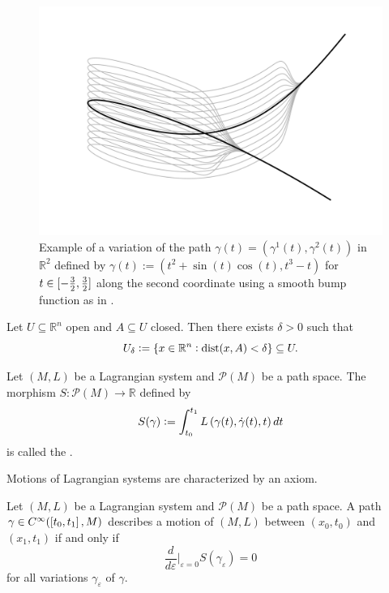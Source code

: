 \begin{example}
	\begin{figure}[h!tb]
		\centering
		\includegraphics[width = .83\textwidth]{variation.pdf}
		\caption{Example of a variation of the path $\gamma(t) = (\gamma^1(t),\gamma^2(t))$ in $\mathbb{R}^2$ defined by $\gamma(t) := (t^2 + \sin(t)\cos(t),t^3 - t)$ for $t \in \intcc[0]{-\frac{3}{2},\frac{3}{2}}$ along the second coordinate using a smooth bump function as in \cite[42]{lee:smooth_manifolds:2013}.}
		\label{fig:variation}
	\end{figure}
\end{example}

\begin{exercise}
	\label{ex:U_delta_neighbourhood}
	Let $U \subseteq \mathbb{R}^n$ open and $A \subseteq U$ closed. Then there exists $\delta > 0$ such that
	\begin{equation*}
		U_\delta := \cbr[0]{x \in \mathbb{R}^n : \dist(x,A) < \delta} \subseteq U.
	\end{equation*}
\end{exercise}

\begin{definition}
	Let $(M,L)$ be a Lagrangian system and $\mathcal{P}(M)$ be a path space. The morphism $S : \mathcal{P}(M) \to \mathbb{R}$ defined by
	\begin{equation*}
		S(\gamma) := \int_{t_0}^{t_1} L\del[0]{\gamma(t),\dot{\gamma}(t),t} dt
	\end{equation*}
	\noindent is called the .
\end{definition}

Motions of Lagrangian systems are characterized by an axiom.

\begin{axiom}
	\label{ax:Hamilton_least_action}
	Let $(M,L)$ be a Lagrangian system and $\mathcal{P}(M)$ be a path space. A path $\gamma \in C^\infty(\intcc[0]{t_0,t_1},M)$ describes a motion of $(M,L)$ between $(x_0,t_0)$ and $(x_1,t_1)$ if and only if 
	\begin{equation}
		\frac{d}{d\varepsilon}\bigg\vert_{\varepsilon = 0} S(\gamma_\varepsilon) = 0
	\end{equation}
	\noindent for all variations $\gamma_\varepsilon$ of $\gamma$.
\end{axiom}

